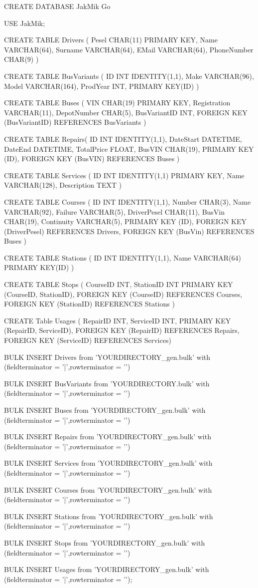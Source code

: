 CREATE DATABASE JakMik
Go

USE JakMik;

CREATE TABLE Drivers (
	Pesel CHAR(11) PRIMARY KEY,
	Name VARCHAR(64),
	Surname VARCHAR(64),
	EMail VARCHAR(64),
	PhoneNumber CHAR(9)
	)

CREATE TABLE BusVariants (
	ID INT IDENTITY(1,1),
	Make VARCHAR(96),
	Model VARCHAR(164),
	ProdYear INT,
	PRIMARY KEY(ID)
	)

CREATE TABLE Buses (
	VIN CHAR(19) PRIMARY KEY,
	Registration VARCHAR(11),
	DepotNumber CHAR(5),
	BusVariantID INT,
	FOREIGN KEY (BusVariantID) REFERENCES BusVariants
	)

CREATE TABLE Repairs(
	ID INT IDENTITY(1,1),
	DateStart DATETIME,
	DateEnd DATETIME,
	TotalPrice FLOAT,
	BusVIN CHAR(19),
	PRIMARY KEY (ID),
	FOREIGN KEY (BusVIN) REFERENCES Buses
	)

CREATE TABLE Services (
	ID INT IDENTITY(1,1) PRIMARY KEY,
	Name VARCHAR(128),
	Description TEXT
	)

CREATE TABLE Courses (
	ID INT IDENTITY(1,1),
	Number CHAR(3),
	Name VARCHAR(92),
	Failure VARCHAR(5),
	DriverPesel CHAR(11),
	BusVin CHAR(19),
	Continuity VARCHAR(5),
	PRIMARY KEY (ID),
	FOREIGN KEY (DriverPesel) REFERENCES Drivers,
	FOREIGN KEY (BusVin) REFERENCES Buses
	)


CREATE TABLE Stations (
	ID INT IDENTITY(1,1),
	Name VARCHAR(64)
	PRIMARY KEY(ID)
	)
	

CREATE TABLE Stops (
	CourseID INT,
	StationID INT
	PRIMARY KEY (CourseID, StationID),
	FOREIGN KEY (CourseID) REFERENCES Courses,
	FOREIGN KEY (StationID) REFERENCES Stations
	)

CREATE Table Usages (
	RepairID INT,
	ServiceID INT,
	PRIMARY KEY (RepairID, ServiceID),
	FOREIGN KEY (RepairID) REFERENCES Repairs,
	FOREIGN KEY (ServiceID) REFERENCES Services)


BULK INSERT Drivers
from 'YOURDIRECTORY\drivers_gen.bulk' 
with (fieldterminator = '|',rowterminator = '\n')


BULK INSERT BusVariants
from 'YOURDIRECTORY\variants.bulk' 
with (fieldterminator = '|',rowterminator = '\n')


BULK INSERT Buses
from 'YOURDIRECTORY\buses_gen.bulk' 
with (fieldterminator = '|',rowterminator = '\n')


BULK INSERT Repairs
from 'YOURDIRECTORY\repairs_gen.bulk' 
with (fieldterminator = '|',rowterminator = '\n')


BULK INSERT Services
from 'YOURDIRECTORY\services_gen.bulk' 
with (fieldterminator = '|',rowterminator = '\n')


BULK INSERT Courses 
from 'YOURDIRECTORY\courses_gen.bulk' 
with (fieldterminator = '|',rowterminator = '\n')


BULK INSERT Stations
from 'YOURDIRECTORY\stations_gen.bulk'
with (fieldterminator = '|',rowterminator = '\n')


BULK INSERT Stops
from 'YOURDIRECTORY\stops_gen.bulk' 
with (fieldterminator = '|',rowterminator = '\n')

BULK INSERT Usages
from 'YOURDIRECTORY\usages_gen.bulk' 
with (fieldterminator = '|',rowterminator = '\n');


